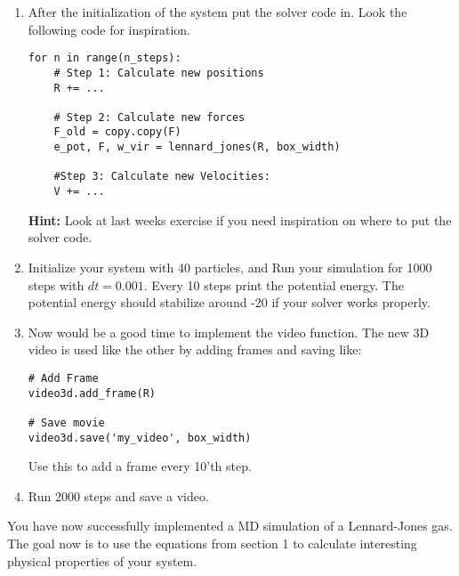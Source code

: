 \documentclass{article}
\begin{document}
\begin{enumerate}[resume]

    \item After the initialization of the system put the solver code in.
        Look the following code for inspiration.

\begin{lstlisting}
for n in range(n_steps):
    # Step 1: Calculate new positions
    R += ...

    # Step 2: Calculate new forces
    F_old = copy.copy(F)
    e_pot, F, w_vir = lennard_jones(R, box_width)

    #Step 3: Calculate new Velocities:
    V += ...
\end{lstlisting}

    {\bf Hint:} Look at last weeks exercise if you need inspiration on where to put the solver code.

    \item Initialize your system with 40 particles,  and 
        Run your simulation for 1000 steps with $dt = 0.001$.
        Every 10 steps print the potential energy.
        The potential energy should stabilize around -20 if your solver works properly.

    \item Now would be a good time to implement the video function.
        The new 3D video is used like the other by adding frames and saving like:

\begin{lstlisting}
# Add Frame
video3d.add_frame(R)

# Save movie
video3d.save('my_video', box_width)

\end{lstlisting}

        Use this to add a frame every 10'th step.

    \item Run 2000 steps and save a video.

\end{enumerate}

You have now successfully implemented a MD simulation of a Lennard-Jones gas.
The goal now is to use the equations from section 1 to calculate interesting physical properties of your system.
\end{document}
